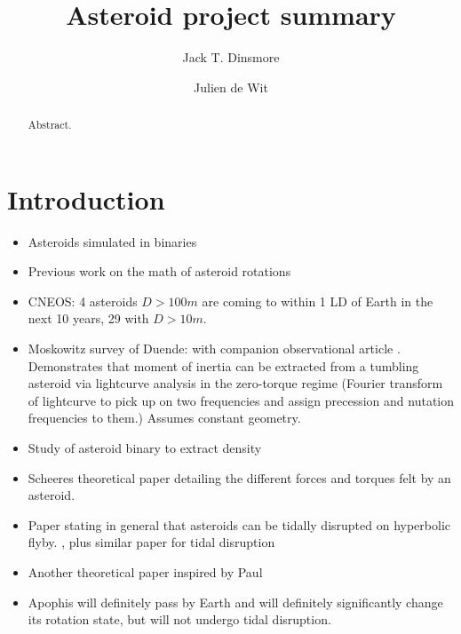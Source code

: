 \documentclass{aastex631}
\begin{document}
\title{Asteroid project summary}


\author[0000-0002-6401-778X]{Jack T. Dinsmore}

\author{Julien de Wit}

\begin{abstract}

Abstract. 
\end{abstract}




\section{Introduction}

\begin{itemize}
\item Asteroids simulated in binaries \cite{Naidu_2015}
\item Previous work on the math of asteroid rotations \cite{ashenberg07, paul88}
\item CNEOS: 4 asteroids $D > 100 m$ are coming to within 1 LD of Earth in the next 10 years, 29 with $D > 10 m$.
\item Moskowitz survey of Duende: \cite{BENSON2020113518} with companion observational article \cite{MOSKOVITZ2020113519}. Demonstrates that moment of inertia can be extracted from a tumbling asteroid via lightcurve analysis in the zero-torque regime (Fourier transform of lightcurve to pick up on two frequencies and assign precession and nutation frequencies to them.) Assumes constant geometry.
\item Study of asteroid binary to extract density \cite{DESCAMPS2020113726}
\item Scheeres theoretical paper \cite{HouMar2017} detailing the different forces and torques felt by an asteroid.
\item Paper stating in general that asteroids can be tidally disrupted on hyperbolic flyby. \cite{SCHEERES2000106}, plus similar paper \cite{RICHARDSON199847} for tidal disruption
\item Another theoretical paper \cite{BOUE2009750} inspired by Paul
\item Apophis will definitely pass by Earth and will definitely significantly change its rotation state, but will not undergo tidal disruption. \cite{SCHEERES2005281}
\end{itemize}
\end{document}
